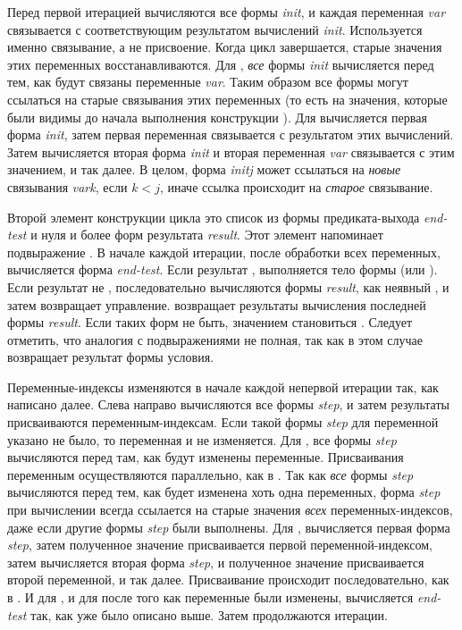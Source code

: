 \begin{defmac}
Перед первой итерацией вычисляются все формы \emph{init}, и каждая переменная
\emph{var} связывается с соответствующим результатом вычислений \emph{init}.
Используется именно связывание, а не присвоение. Когда цикл завершается, старые
значения этих переменных восстанавливаются.
Для , \emph{все} формы \emph{init} вычисляется перед тем, как будут
связаны переменные \emph{var}. Таким образом все формы могут ссылаться на старые
связывания этих переменных
(то есть на значения, которые были видимы до начала выполнения конструкции
).
Для  вычисляется первая форма \emph{init}, затем первая переменная
связывается с результатом этих вычислений. Затем вычисляется вторая форма
\emph{init} и вторая переменная \emph{var} связывается с этим значением, и так
далее.
В целом, форма \emph{initj} может ссылаться на \emph{новые} связывания
\emph{vark}, если $k<j$, иначе ссылка происходит на \emph{старое} связывание.

Второй элемент конструкции цикла это список из формы предиката-выхода
\emph{end-test} и нуля и более форм результата \emph{result}.
Этот элемент напоминает подвыражение .
В начале каждой итерации, после обработки всех переменных, вычисляется форма
\emph{end-test}. Если результат {\false}, выполняется тело формы  (или
).
Если результат не {\false}, последовательно вычисляются формы \emph{result}, как
неявный ,
и затем  возвращает управление.  возвращает результаты
вычисления последней формы \emph{result}.
Если таких форм не быть, значением  становиться {\false}.
Следует отметить, что аналогия с подвыражениями  не полная, так как
 в этом случае возвращает результат формы условия.

Переменные-индексы изменяются в начале каждой непервой итерации так, как
написано далее. Слева направо вычисляются все формы \emph{step}, и затем
результаты присваиваются переменным-индексам.
Если такой формы \emph{step} для переменной указано не было, то переменная и не
изменяется.
Для , все формы \emph{step} вычисляются перед там, как будут изменены
переменные. Присваивания переменным осуществляются параллельно, как в
.
Так как \emph{все} формы \emph{step} вычисляются перед тем, как будет изменена
хоть одна переменных, форма \emph{step} при вычислении всегда ссылается на
старые значения \emph{всех} переменных-индексов, даже если другие формы
\emph{step} были выполнены.
Для , вычисляется первая форма \emph{step}, затем полученное значение
присваивается первой переменной-индексом, затем вычисляется вторая форма
\emph{step}, и полученное значение присваивается второй переменной, и так
далее. Присваивание происходит последовательно, как в .
И для , и для  после того как переменные были изменены,
вычисляется \emph{end-test} так, как уже было описано выше. Затем продолжаются
итерации.


\end{defmac}
